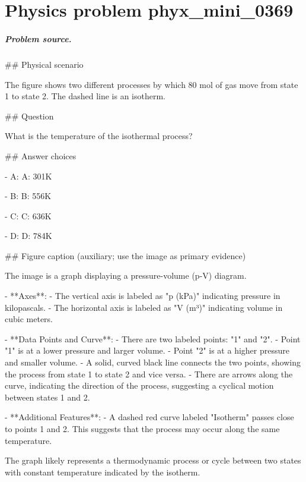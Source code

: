 
\chapter{Physics problem phyx\_mini\_0369}
\label{ch:PhyXMiniProblems_problem_phyx_mini_0369}

\paragraph{Problem source.}
\#\# Physical scenario

The figure shows two different processes by which 80 mol of gas move from state 1 to state 2. The dashed line is an isotherm.

\#\# Question

What is the temperature of the isothermal process?

\#\# Answer choices

- A: A: 301K

- B: B: 556K

- C: C: 636K

- D: D: 784K

\#\# Figure caption (auxiliary; use the image as primary evidence)

The image is a graph displaying a pressure-volume (p-V) diagram.

- **Axes**: 
  - The vertical axis is labeled as "p (kPa)" indicating pressure in kilopascals.
  - The horizontal axis is labeled as "V (m³)" indicating volume in cubic meters.

- **Data Points and Curve**:
  - There are two labeled points: "1" and "2".
  - Point "1" is at a lower pressure and larger volume.
  - Point "2" is at a higher pressure and smaller volume.
  - A solid, curved black line connects the two points, showing the process from state 1 to state 2 and vice versa.
  - There are arrows along the curve, indicating the direction of the process, suggesting a cyclical motion between states 1 and 2.

- **Additional Features**:
  - A dashed red curve labeled "Isotherm" passes close to points 1 and 2. This suggests that the process may occur along the same temperature.

The graph likely represents a thermodynamic process or cycle between two states with constant temperature indicated by the isotherm.

